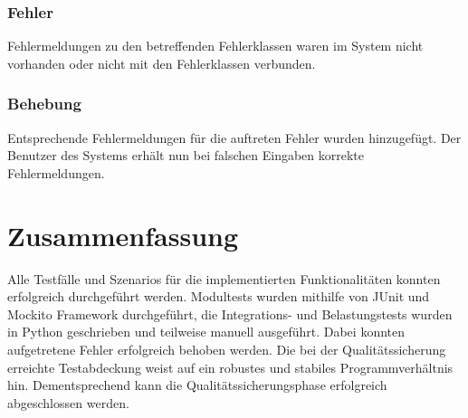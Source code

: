 \documentclass[a4paper,20pt,oneside]{book}
\begin{document}
	\subsection{Fehler}
	Fehlermeldungen zu den betreffenden Fehlerklassen waren im System nicht vorhanden oder nicht mit den Fehlerklassen verbunden.
	\subsection{Behebung}
	Entsprechende Fehlermeldungen für die auftreten Fehler wurden hinzugefügt. Der Benutzer des Systems erhält nun bei falschen Eingaben korrekte Fehlermeldungen.
	
	\chapter{Zusammenfassung}
	Alle  Testfälle  und  Szenarios für die implementierten Funktionalitäten konnten erfolgreich durchgeführt werden. Modultests wurden mithilfe von JUnit und Mockito Framework durchgeführt, die Integrations- und Belastungstests wurden in Python geschrieben und teilweise manuell ausgeführt. Dabei konnten aufgetretene Fehler erfolgreich behoben werden. Die bei der Qualitätssicherung erreichte Testabdeckung weist auf ein robustes und stabiles Programmverhältnis hin. Dementsprechend kann die Qualitätssicherungsphase erfolgreich abgeschlossen werden.
	\printglossaries
\end{document}
